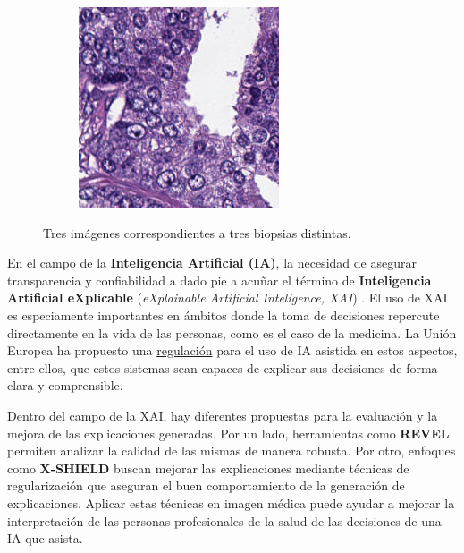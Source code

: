 \begin{figure}[H]
\begin{subfigure}[b]{0.3\textwidth}
    \end{subfigure}    
    \hfill
    \begin{subfigure}[b]{0.3\textwidth}
        \includegraphics[width=\linewidth]{images/EjemploBiopsia3.png}
    \end{subfigure}

    \caption{Tres imágenes correspondientes a tres biopsias distintas.}
    \label{fig:biopsias_ejemplos}
\end{figure}


En el campo de la \textbf{Inteligencia Artificial (IA)}, la necesidad de asegurar transparencia y confiabilidad a dado pie a acuñar el término de \textbf{Inteligencia Artificial eXplicable} (\textit{eXplainable Artificial Inteligence, XAI}) \cite{XAIManifesto}. El uso de XAI es especiamente importantes en ámbitos donde la toma de decisiones repercute directamente en la vida de las personas, como es el caso de la medicina. La Unión Europea ha propuesto una \href{https://eur-lex.europa.eu/eli/reg/2024/1689/oj}{regulación} para el uso de IA asistida en estos aspectos, entre ellos, que estos sistemas sean capaces de explicar sus decisiones de forma clara y comprensible.

Dentro del campo de la XAI, hay diferentes propuestas para la evaluación y la mejora de las explicaciones generadas. Por un lado, herramientas como \textbf{REVEL} \cite{REVEL} permiten analizar la calidad de las mismas de manera robusta. Por otro, enfoques como \textbf{X-SHIELD} \cite{XSHIELD} buscan mejorar las explicaciones mediante técnicas de regularización que aseguran el buen comportamiento de la generación de explicaciones. Aplicar estas técnicas en imagen médica puede ayudar a mejorar la interpretación de las personas profesionales de la salud de las decisiones de una IA que asista.

